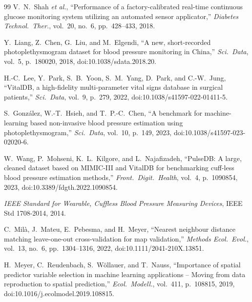 \begin{thebibliography}{99}
V.~N.~Shah \emph{et al.}, ``Performance of a factory-calibrated real-time
continuous glucose monitoring system utilizing an automated sensor applicator,''
\emph{Diabetes Technol.\ Ther.}, vol.~20, no.~6, pp.~428--433, 2018.


Y.~Liang, Z.~Chen, G.~Liu, and M.~Elgendi, ``A new, short-recorded
photoplethysmogram dataset for blood pressure monitoring in China,''
\emph{Sci.\ Data}, vol.~5, p.~180020, 2018, doi:10.1038/sdata.2018.20.


H.-C.~Lee, Y.~Park, S.~B.~Yoon, S.~M.~Yang, D.~Park, and C.-W.~Jung,
``VitalDB, a high-fidelity multi-parameter vital signs database in surgical
patients,'' \emph{Sci.\ Data}, vol.~9, p.~279, 2022,
doi:10.1038/s41597-022-01411-5.

S.~Gonz\'alez, W.-T.~Hsieh, and T.~P.-C.~Chen, ``A benchmark for
machine-learning based non-invasive blood pressure estimation using
photoplethysmogram,'' \emph{Sci.\ Data}, vol.~10, p.~149, 2023,
doi:10.1038/s41597-023-02020-6.

W.~Wang, P.~Mohseni, K.~L.~Kilgore, and L.~Najafizadeh, ``PulseDB: A large,
cleaned dataset based on MIMIC-III and VitalDB for benchmarking cuff-less
blood pressure estimation methods,'' \emph{Front.\ Digit.\ Health}, vol.~4,
p.~1090854, 2023, doi:10.3389/fdgth.2022.1090854.


\emph{IEEE Standard for Wearable, Cuffless Blood Pressure Measuring
Devices}, IEEE Std 1708-2014, 2014.


C.~Mil\`a, J.~Mateu, E.~Pebesma, and H.~Meyer, ``Nearest neighbour distance
matching leave-one-out cross-validation for map validation,'' \emph{Methods
Ecol.\ Evol.}, vol.~13, no.~6, pp.~1304--1316, 2022,
doi:10.1111/2041-210X.13851.

H.~Meyer, C.~Reudenbach, S.~W\"ollauer, and T.~Nauss, ``Importance of spatial
predictor variable selection in machine learning applications -- Moving from
data reproduction to spatial prediction,'' \emph{Ecol.\ Modell.}, vol.~411,
p.~108815, 2019, doi:10.1016/j.ecolmodel.2019.108815.

\end{thebibliography}